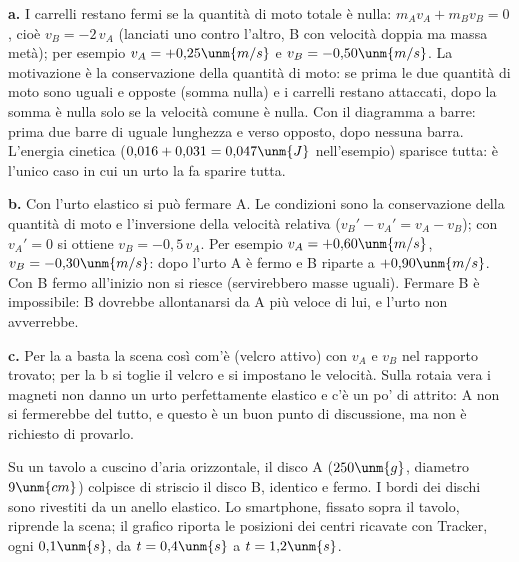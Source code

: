 \documentclass[10pt]{article}
\begin{document}
\begin{solution}
\textbf{a.} I carrelli restano fermi se la quantità di moto totale è nulla:
$m_A v_A + m_B v_B = 0$, cioè $v_B = -2\,v_A$ (lanciati uno contro l'altro, B con velocità
doppia ma massa metà); per esempio $v_A = +0{,}25\unm{m/s}$ e $v_B = -0{,}50\unm{m/s}$. La
motivazione è la conservazione della quantità di moto: se prima le due quantità di moto sono
uguali e opposte (somma nulla) e i carrelli restano attaccati, dopo la somma è nulla solo se la
velocità comune è nulla. Con il diagramma a barre: prima due barre di uguale lunghezza e verso
opposto, dopo nessuna barra. L'energia cinetica
($0{,}016 + 0{,}031 = 0{,}047\unm{J}$ nell'esempio) sparisce tutta: è l'unico caso in cui un urto
la fa sparire tutta.

\textbf{b.} Con l'urto elastico si può fermare A. Le condizioni sono la conservazione della
quantità di moto e l'inversione della velocità relativa ($v_B' - v_A' = v_A - v_B$); con
$v_A' = 0$ si ottiene $v_B = -0{,}5\,v_A$. Per esempio $v_A = +0{,}60\unm{m/s}$,
$v_B = -0{,}30\unm{m/s}$: dopo l'urto A è fermo e B riparte a $+0{,}90\unm{m/s}$. Con B fermo
all'inizio non si riesce (servirebbero masse uguali). Fermare B è impossibile: B dovrebbe
allontanarsi da A più veloce di lui, e l'urto non avverrebbe.

\textbf{c.} Per la a basta la scena così com'è (velcro attivo) con $v_A$ e $v_B$ nel rapporto
trovato; per la b si toglie il velcro e si impostano le velocità. Sulla rotaia vera i magneti non
danno un urto perfettamente elastico e c'è un po' di attrito: A non si fermerebbe del tutto, e
questo è un buon punto di discussione, ma non è richiesto di provarlo.
\end{solution}

\newpage
{}
Su un tavolo a cuscino d'aria orizzontale, il disco A ($250\unm{g}$, diametro $9\unm{cm}$)
colpisce di striscio il disco B, identico e fermo. I bordi dei dischi sono rivestiti da un anello
elastico. Lo smartphone, fissato sopra il tavolo, riprende la scena; il grafico riporta le
posizioni dei centri ricavate con Tracker, ogni $0{,}1\unm{s}$, da $t = 0{,}4\unm{s}$ a
$t = 1{,}2\unm{s}$.
\end{document}
